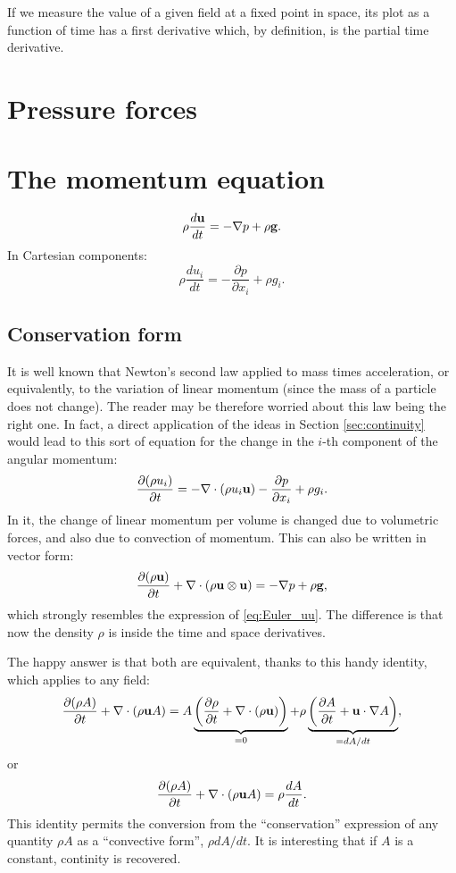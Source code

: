 If we measure the value of a given field at a fixed point in space,
its plot as a function of time has a first derivative which, by definition,
is the partial time derivative.


\section{Pressure forces}


\section{The momentum equation}

\begin{equation}
  \label{eq:Euler_momentum}
  \rho \frac{d\mathbf{u} }{dt} = - \nabla p + \rho \mathbf{g} .
\end{equation}
In Cartesian components:
\begin{equation}
  \label{eq:Euler_momentum_C}
  \rho \frac{d u_i }{dt} =
  - \frac{\partial p} {\partial x_i} 
  + \rho g_i .
\end{equation}

\subsection{Conservation form}

It is well known that Newton's second law applied to mass times
acceleration, or equivalently, to the variation of linear momentum
(since the mass of a particle does not change). The reader may be
therefore worried about this law being the right one.  In fact, a
direct application of the ideas in Section \ref{sec:continuity} would
lead to this sort of equation for the change in the $i$-th component
of the angular momentum:
\[
\frac{\partial (\rho u_i) } {\partial t} =
- \nabla \cdot  ( \rho u_i \mathbf{u} )
- \frac{\partial p} {\partial x_i} 
  + \rho g_i .
\]
In it, the change of linear momentum per volume is changed due to
volumetric forces, and also due to convection of momentum. This can
also be written in vector form:
\[
\frac{\partial  (\rho \mathbf{u} ) }{\partial t} +
\nabla \cdot ( \rho \mathbf{u} \otimes \mathbf{u} ) =
  - \nabla p 
  + \rho \mathbf{g} ,
\]
which strongly resembles the expression of \ref{eq:Euler_uu}. The
difference is that now the density $\rho$ is inside the time and
space derivatives.

The happy answer is that both are equivalent, thanks to this handy
identity, which applies to any field:
\[
\frac{\partial ( \rho  A ) }{\partial t} +
\nabla  \cdot ( \rho \bfu A) =
%
A
\underbrace{
\left(
\frac{\partial \rho }{\partial t} +
\nabla  \cdot ( \rho \bfu ) 
\right)}_{=0}  +
\rho 
\underbrace{
\left(
\frac{\partial A }{\partial t} +
\bfu \cdot \nabla  A
\right) }_{=dA/dt}  ,
\]
or
\begin{equation}
  \label{eq:conserv_to_total}
  \frac{\partial ( \rho  A ) }{\partial t} +
  \nabla  \cdot ( \rho \mathbf{u} A) =
  \rho \frac{d  A }{d t} .
\end{equation}
This identity permits the conversion from the ``conservation''
expression of any quantity $\rho A$ as a ``convective form'', $\rho
dA/dt$. It is interesting that if $A$ is a constant, continity is
recovered.

